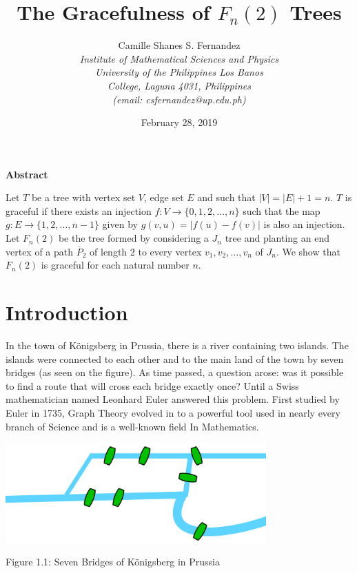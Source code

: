 \documentclass[a4paper, 11pt]{article}
\begin{document}
		\title{\textbf{The Gracefulness of $F_n(2)$ Trees}}
		\author{
		Camille Shanes S. Fernandez\\
		\textit{Institute of Mathematical Sciences and Physics}\\
		\textit{University of the Philippines Los Banos}\\
		\textit{College, Laguna 4031, Philippines}	\\
		\textit{(email: csfernandez@up.edu.ph)}	}
		\date{February 28, 2019}
	\maketitle
	
	\begin{center}
		\textbf{Abstract}
	\end{center}
\indent 
\indent Let $T$ be a tree with vertex set $V$, edge set $E$ and such that $|V|=|E|+1=n$. $T$ is graceful if there exists an injection $f : V \rightarrow \{0,1,2, \dots, n\}$ such that the map $g : E \rightarrow \{1,2, \dots, n-1\}$ given by $g(v,u)=|f(u)-f(v)|$ is also an injection.\\
\indent Let $F_n (2)$ be the tree formed by considering a $J_n$ tree and planting an end vertex of a path $\overline{P}_2$ of length $2$ to every vertex $v_1, v_2, \dots, v_n$ of $J_n$. We show that $F_n (2)$ is graceful for each natural number $n$.\\

\section{Introduction}
\indent
\indent In the town of K\"{o}nigsberg in Prussia, there is a river containing two islands. The islands were connected to each other and to the main land of the town by seven bridges (as seen on the figure). As time passed, a question arose: was it possible to find a route that will cross each bridge exactly once? Until a Swiss mathematician named Leonhard Euler answered this problem.  First studied by Euler in 1735, Graph Theory evolved in to a powerful tool used in nearly every branch of Science and is a well-known field In Mathematics.
\begin{center}
   \includegraphics[width=10cm]{bridges.png} 
   \begin{center}
       \caption{\label{fig:my-label}Figure 1.1: Seven Bridges of K\"{o}nigsberg in Prussia}
   \end{center}
\end{center}
\end{document}
